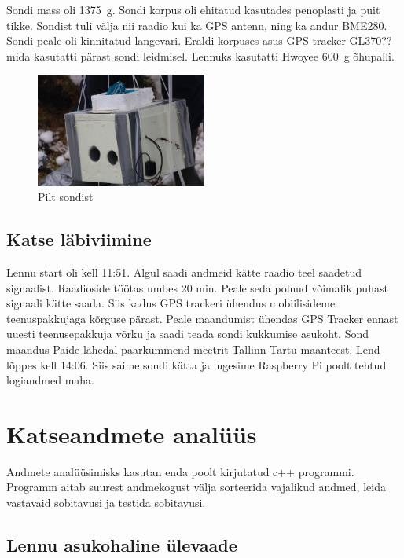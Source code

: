 \documentclass{trkut}%
\begin{document}
Sondi mass oli \SI{1375}{g}. Sondi korpus oli ehitatud kasutades penoplasti ja puit tikke. Sondist tuli välja nii raadio kui ka GPS antenn, ning ka andur BME280. Sondi peale oli kinnitatud langevari. Eraldi korpuses asus GPS tracker GL370?? mida kasutatti pärast sondi leidmisel. Lennuks kasutatti Hwoyee \SI{600}{g} õhupalli.

\begin{figure}[h]
	\includegraphics[width=0.5\textwidth]{PicGra/sond.jpg}
	\caption{Pilt sondist}
	\label{sond}%
\end{figure}




\section{Katse läbiviimine}
Lennu start oli kell 11:51. Algul saadi andmeid kätte raadio teel saadetud signaalist. Raadioside töötas umbes 20 min. Peale seda polnud võimalik puhast signaali kätte saada. Siis kadus GPS trackeri ühendus mobiilisideme teenuspakkujaga kõrguse pärast. Peale maandumist ühendas GPS Tracker ennast uuesti teenusepakkuja võrku ja saadi teada sondi kukkumise asukoht. Sond maandus Paide lähedal paarkümmend meetrit Tallinn-Tartu maanteest. Lend lõppes kell 14:06. Siis saime sondi kätta ja lugesime Raspberry Pi poolt tehtud logiandmed maha.



\chapter{Katseandmete analüüs}
Andmete analüüsimisks kasutan enda poolt kirjutatud c++ programmi. Programm aitab suurest andmekogust välja sorteerida vajalikud andmed, leida vastavaid sobitavusi ja testida sobitavusi.

\section{Lennu asukohaline ülevaade}
\end{document}
